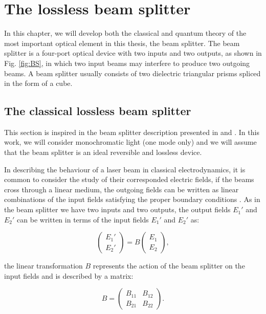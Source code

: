 \documentclass[12pt]{book}
\begin{document}
\chapter{The lossless beam splitter}


In this chapter, we will develop both the classical and quantum theory of the most important optical element in this thesis, the beam splitter. The beam splitter is a four-port optical device with two inputs and two outputs, as shown in Fig. \ref{fig:BS}, in which two input beams may interfere to produce two outgoing beams. A beam splitter usually consists of two dielectric triangular prisms spliced in the form of a cube.

\section{The  classical lossless beam splitter}

This section is inspired in the beam splitter description presented in \cite{ludon} and \cite{leonhardt}. In this work, we will consider monochromatic light (one mode only) and we will assume that the beam splitter is an ideal reversible and lossless device.


In describing the behaviour of a laser beam in classical electrodynamics, it is common to consider the study of their corresponded electric fields, if the beams cross through a linear medium, the outgoing fields can be written as linear combinations of the input fields satisfying the proper boundary conditions \cite{jackson}. As in the beam splitter we have two inputs and two outputs, the output fields $E_{1}'$ and $E_{2}'$  can be written in terms of the input fields $E_{1}'$ and $E_{2}'$ as:

\begin{equation}
\begin{pmatrix} E_{1}' \\ E_{2}' \end{pmatrix}=B\begin{pmatrix} E_{1} \\ E_{2} \end{pmatrix},
\end{equation}

the linear transformation $B$ represents the action of the beam splitter on the input fields and is described by a matrix:

\begin{equation}
B=\begin{pmatrix} B_{11}& B_{12} \\B_{21} & B_{22} \end{pmatrix}.
\end{equation}
\end{document}
